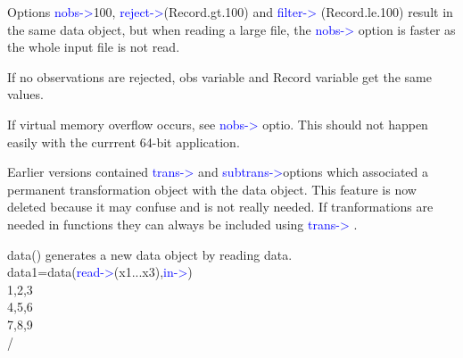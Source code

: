 \begin{note}
Options \textcolor{blue}{nobs->}100, \textcolor{blue}{reject->}(Record.gt.100) and \textcolor{blue}{filter->}
(Record.le.100) result in the same data object, but when reading a large file, the \textcolor{blue}{nobs->}
option is faster as the whole input file is not read.
\end{note}
\begin{note}
If no observations are rejected, obs variable and Record variable get the same values.
\end{note}
\begin{note}
If virtual memory overflow occurs, see \textcolor{blue}{nobs->} optio. This should not happen easily with the currrent
64-bit application.
\end{note}
\begin{note}
Earlier versions contained \textcolor{blue}{trans->} and \textcolor{blue}{subtrans->}options which associated
a permanent transformation object with the data object. This feature is now deleted because
it may confuse and is not really needed. If tranformations are needed in functions
they can always be included using \textcolor{blue}{trans->} .
\end{note}
\begin{example}[dataex]data() generates a new data object by reading data.\\
\label{dataex}
data1=\textcolor{VioletRed}{data}(\textcolor{blue}{read->}(x1...x3),\textcolor{blue}{in->})\\
1,2,3\\
4,5,6\\
7,8,9\\
/
\end{example}

